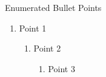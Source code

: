\begin{frame}{Enumerated Bullet Points}
  \begin{enumerate}
    \item Point 1
    \begin{enumerate}
        \item Point 2
        \begin{enumerate}
            \item Point 3
        \end{enumerate}
    \end{enumerate}
  \end{enumerate}
\end{frame}
